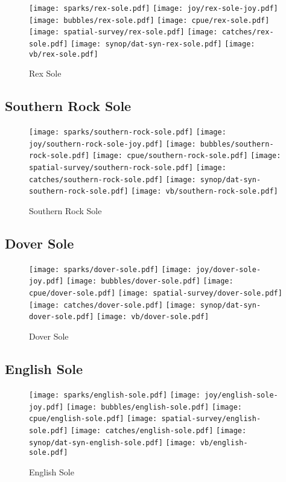\begin{figure}[htbp]
\centering
\texttt{[image: sparks/rex-sole.pdf]}
\texttt{[image: joy/rex-sole-joy.pdf]}
\texttt{[image: bubbles/rex-sole.pdf]}
\texttt{[image: cpue/rex-sole.pdf]}
\texttt{[image: spatial-survey/rex-sole.pdf]}
\texttt{[image: catches/rex-sole.pdf]}
\texttt{[image: synop/dat-syn-rex-sole.pdf]}
\texttt{[image: vb/rex-sole.pdf]}
\caption{Rex Sole}
\end{figure}
\clearpage
\subsection*{Southern Rock Sole}

\begin{figure}[htbp]
\centering
\texttt{[image: sparks/southern-rock-sole.pdf]}
\texttt{[image: joy/southern-rock-sole-joy.pdf]}
\texttt{[image: bubbles/southern-rock-sole.pdf]}
\texttt{[image: cpue/southern-rock-sole.pdf]}
\texttt{[image: spatial-survey/southern-rock-sole.pdf]}
\texttt{[image: catches/southern-rock-sole.pdf]}
\texttt{[image: synop/dat-syn-southern-rock-sole.pdf]}
\texttt{[image: vb/southern-rock-sole.pdf]}
\caption{Southern Rock Sole}
\end{figure}
\clearpage
\subsection*{Dover Sole}

\begin{figure}[htbp]
\centering
\texttt{[image: sparks/dover-sole.pdf]}
\texttt{[image: joy/dover-sole-joy.pdf]}
\texttt{[image: bubbles/dover-sole.pdf]}
\texttt{[image: cpue/dover-sole.pdf]}
\texttt{[image: spatial-survey/dover-sole.pdf]}
\texttt{[image: catches/dover-sole.pdf]}
\texttt{[image: synop/dat-syn-dover-sole.pdf]}
\texttt{[image: vb/dover-sole.pdf]}
\caption{Dover Sole}
\end{figure}
\clearpage
\subsection*{English Sole}

\begin{figure}[htbp]
\centering
\texttt{[image: sparks/english-sole.pdf]}
\texttt{[image: joy/english-sole-joy.pdf]}
\texttt{[image: bubbles/english-sole.pdf]}
\texttt{[image: cpue/english-sole.pdf]}
\texttt{[image: spatial-survey/english-sole.pdf]}
\texttt{[image: catches/english-sole.pdf]}
\texttt{[image: synop/dat-syn-english-sole.pdf]}
\texttt{[image: vb/english-sole.pdf]}
\caption{English Sole}
\end{figure}
\clearpage
